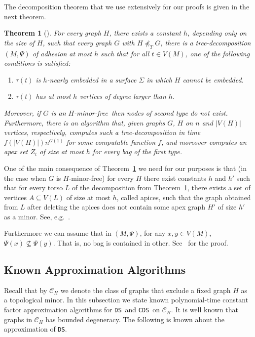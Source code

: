 \documentclass[11pt]{article}
\newtheorem{theorem}{Theorem}
\newcommand{\Hmf}{$H$-minor-free}
\newcommand{\tDS}{{\texttt{\sc DS}}}
\newcommand{\tCDS}{{\texttt{\sc CDS}}}
\newcommand{\cO}{\mathcal{O}}
\begin{document}
\noindent
The decomposition theorem that we use extensively for our proofs is given in the next theorem. 
\begin{theorem}  [\cite{abs-1209-0129,GroheM12,RobertsonS03}]
\label{thm:structure theorem}  
For every graph $H$, there exists a constant $h$, 
depending only on the size of $H$, such that every graph $G$  with $H\not\preceq_T G$, there is a tree-decomposition 
$(M,\Psi)$ of adhesion at most $h$ such that for all $t\in V(M)$, one of the following conditions is satisfied: 
\begin{enumerate}
\item  $\tau(t)$  is $h$-nearly embedded in a surface $\Sigma$ in which $H$ cannot be embedded.
\item $\tau(t)$ has at most $h$ vertices of degree larger than $h$.
\end{enumerate}
Moreover, if $G$ is an \Hmf \,   then nodes of second type do not exist. 
\noindent
Furthermore, there is an algorithm that, given graphs $G$, $H$ on $n$ and $|V(H)|$ vertices, respectively, computes such a tree-decomposition in time 
$f(|V(H)|)n^{\cO(1)}$ for some computable function $f$,  and moreover computes an apex set $Z_t$ of size at most $h$  
for every bag of the first type.
\end{theorem}
One of the main consequence of Theorem~\ref{thm:structure theorem} we need for our purposes is  that (in the case when 
$G$ is \Hmf) for every 
$H$ there exist  constants $h$ and $h'$ such that  for every torso $L$  of the decomposition from 
Theorem~\ref{thm:structure theorem}, there exists a set of vertices $A \subseteq V(L)$ of size at most $h$, called apices, such 
that the graph obtained from $L$ after deleting the apices does not contain some  apex graph $H'$ of size 
$h'$ as a minor. See, e.g.~\cite[Theorem $13$]{Grohe03}. 

 Furthermore we can assume that in  $(M,\Psi)$, for any $x,y\in V(M)$, $\Psi(x)\not \subseteq \Psi(y)$. That is, no bag is contained in other. 
 See~\cite[Lemma 11.9]{FlumGrohebook} for the proof.  
 






  



\subsection{Known Approximation Algorithms}
Recall that by $\mathcal{C}_H$ we denote the class of graphs that exclude a fixed graph $H$ as a topological minor. 
In this subsection we state known polynomial-time constant factor approximation algorithms  for \tDS \, and \tCDS\ on $\mathcal{C}_H$. It is well known that graphs in 
$\mathcal{C}_H$ has bounded 
degeneracy. The following is known about the approximation of \tDS. 
\end{document}
